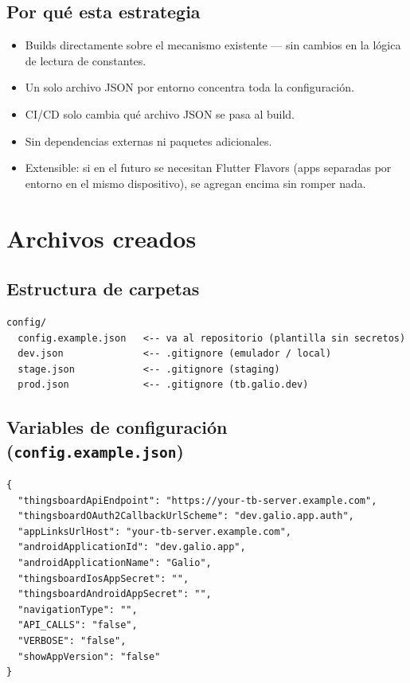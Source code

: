 \documentclass[12pt, a4paper]{article}
\begin{document}
\subsection{Por qué esta estrategia}

\begin{itemize}
  \item Builds directamente sobre el mecanismo existente --- sin cambios en la
        lógica de lectura de constantes.
  \item Un solo archivo JSON por entorno concentra toda la configuración.
  \item CI/CD solo cambia qué archivo JSON se pasa al build.
  \item Sin dependencias externas ni paquetes adicionales.
  \item Extensible: si en el futuro se necesitan Flutter Flavors (apps
        separadas por entorno en el mismo dispositivo), se agregan encima sin
        romper nada.
\end{itemize}

\section{Archivos creados}

\subsection{Estructura de carpetas}

\begin{lstlisting}[style=bash]
config/
  config.example.json   <-- va al repositorio (plantilla sin secretos)
  dev.json              <-- .gitignore (emulador / local)
  stage.json            <-- .gitignore (staging)
  prod.json             <-- .gitignore (tb.galio.dev)
\end{lstlisting}

\subsection{Variables de configuración (\texttt{config.example.json})}

\begin{lstlisting}[style=json, caption=config/config.example.json]
{
  "thingsboardApiEndpoint": "https://your-tb-server.example.com",
  "thingsboardOAuth2CallbackUrlScheme": "dev.galio.app.auth",
  "appLinksUrlHost": "your-tb-server.example.com",
  "androidApplicationId": "dev.galio.app",
  "androidApplicationName": "Galio",
  "thingsboardIosAppSecret": "",
  "thingsboardAndroidAppSecret": "",
  "navigationType": "",
  "API_CALLS": "false",
  "VERBOSE": "false",
  "showAppVersion": "false"
}
\end{lstlisting}
\end{document}
